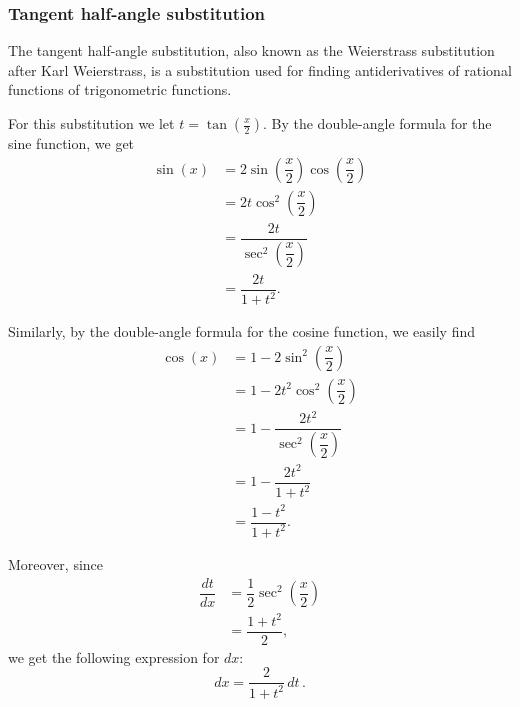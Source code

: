 \ifanalysis


\subsubsection{Tangent half-angle substitution}
The  tangent half-angle substitution, also known as the Weierstrass substitution after Karl Weierstrass, is a substitution used for finding antiderivatives of rational functions of trigonometric functions.

For this substitution we let $t = \tan\left(\frac{x}{2}\right)$. By the double-angle formula for the sine function, we get 
\allowdisplaybreaks
\begin{align*}
\sin (x)&=2\sin {\left(\dfrac {x}{2}\right)}\cos {\left(\dfrac {x}{2}\right)}\\[6pt]&=2t\cos ^{2}{\left(\dfrac {x}{2}\right)}\\[6pt]&={\dfrac {2t}{\sec ^{2}{\left(\dfrac {x}{2}\right)}}}\\[6pt]&={\dfrac {2t}{1+t^{2}}}.\end{align*} 

Similarly, by the double-angle formula for the cosine function, we easily find
\allowdisplaybreaks
\begin{align*}
\cos (x)&=1-2\sin ^{2}{\left(\dfrac {x}{2}\right)}\\[6pt]&=1-2t^{2}\cos ^{2}{\left(\dfrac {x}{2}\right)}\\[6pt]&=1-{\dfrac {2t^{2}}{\sec ^{2}{\left(\dfrac {x}{2}\right)}}}\\[6pt]&=1-{\dfrac {2t^{2}}{1+t^{2}}}\\[6pt]&={\dfrac {1-t^{2}}{1+t^{2}}}.
\end{align*}

Moreover, since 
$$
\begin{aligned}{\dfrac {dt}{dx}}&={\dfrac {1}{2}}\sec ^{2}{\left(\dfrac {x}{2}\right)}\\[6pt]&={\dfrac {1+t^{2}}{2}},
\end{aligned}
$$
we get the following expression for $dx$:
$$
\displaystyle dx={\frac {2}{1+t^{2}}}\,dt\,.
$$


